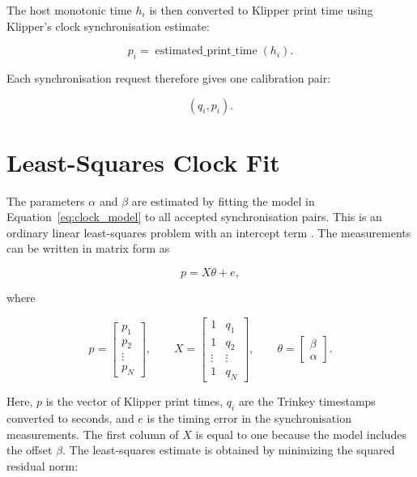 \documentclass[11pt,a4paper]{article}
\begin{document}
The host monotonic time \(h_i\) is then converted to Klipper print time using
Klipper's clock synchronisation estimate:

\begin{equation}
    p_i = \operatorname{estimated\_print\_time}(h_i).
\end{equation}

Each synchronisation request therefore gives one calibration pair:

\begin{equation}
    (q_i, p_i).
\end{equation}

\section{Least-Squares Clock Fit}

The parameters \(\alpha\) and \(\beta\) are estimated by fitting the model in
Equation~\eqref{eq:clock_model} to all accepted synchronisation pairs. This is
an ordinary linear least-squares problem with an intercept term
\cite{montgomery2012linear}. The measurements can be written in matrix form as

\begin{equation}
    p = X\theta + e,
\end{equation}

where

\begin{equation}
    p =
    \begin{bmatrix}
        p_1 \\
        p_2 \\
        \vdots \\
        p_N
    \end{bmatrix},
    \qquad
    X =
    \begin{bmatrix}
        1 & q_1 \\
        1 & q_2 \\
        \vdots & \vdots \\
        1 & q_N
    \end{bmatrix},
    \qquad
    \theta =
    \begin{bmatrix}
        \beta \\
        \alpha
    \end{bmatrix}.
\end{equation}

Here, \(p\) is the vector of Klipper print times, \(q_i\) are the Trinkey
timestamps converted to seconds, and \(e\) is the timing error in the
synchronisation measurements. The first column of \(X\) is equal to one because
the model includes the offset \(\beta\). The least-squares estimate is obtained
by minimizing the squared residual norm:
\end{document}
